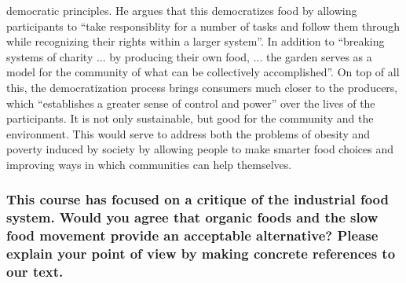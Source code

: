 \documentclass[letterpaper, 12pt]{article}
\begin{document}
democratic principles. He argues that this democratizes food by allowing
participants to ``take responsiblity for a number of tasks and follow them
through while recognizing their rights within a larger system''. In addition to
``breaking systems of charity ... by producing their own food, ... the garden
serves as a model for the community of what can be collectively accomplished''.
On top of all this, the democratization process brings consumers much closer
to the producers, which ``establishes a greater sense of control and power''
over the lives of the participants. It is not only sustainable, but good for
the community and the environment. This would serve to address both the
problems of obesity and poverty induced by society by allowing people to make
smarter food choices and improving ways in which communities can help
themselves.

\subsubsection*{This course has focused on a critique of the industrial food
system. Would you agree that organic foods and the slow food movement provide
an acceptable alternative? Please explain your point of view by making concrete
references to our text.}
\end{document}
